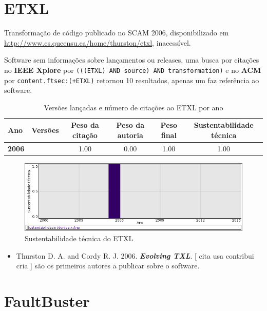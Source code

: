 \section{ETXL}

Transformação de código
publicado no SCAM 2006,
disponibilizado em \url{http://www.cs.queensu.ca/home/thurston/etxl},
inacessível.

Software sem informações sobre lançamentos ou releases,
uma busca por citações no {\bf IEEE Xplore} por
\texttt{(((ETXL) AND source) AND transformation)}
e no {\bf ACM} por
\texttt{content.ftsec:(+ETXL)}
retornou
10 resultados,
apenas um faz referência ao software.


\begin{table}[H]
\caption{Versões lançadas e número de citações ao ETXL por ano}
\centering
\begin{tabular}{| l | c | c | c | c | c |}
  \hline
  Ano & Versões & Peso da citação & Peso da autoria & Peso final & Sustentabilidade técnica \\
  \hline
            {\bf 2006}
          &
          
          &
          1.00
          &
          0.00
          &
          1.00
          &
            {\color{blue} 1.00}
          \\
\hline
\end{tabular}
\end{table}

\begin{figure}[h]
  \center
  \includegraphics[scale=0.50]{result-documents/charts/etxl.png}
  \caption{Sustentabilidade técnica do ETXL}
\end{figure}


\begin{itemize}
\item Thurston D. A. and Cordy R. J.
      2006.
        \textbf{\textit{ Evolving TXL}}.
      [
          cita
          usa
          contribui
          cria
      ]
são os primeiros autores a publicar sobre o software.
\end{itemize}
\section{FaultBuster}

